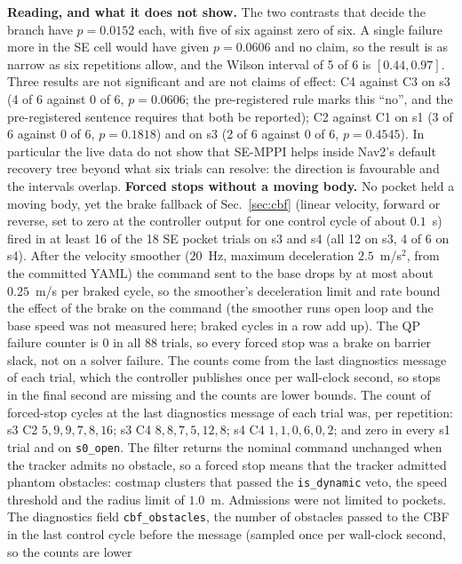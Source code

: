 \documentclass[journal]{IEEEtran}
\begin{document}
\textbf{Reading, and what it does not show.} The two contrasts that decide the branch have $p=0.0152$ each,
with five of six against zero of six. A single failure more in the SE cell would have given $p=0.0606$ and no
claim, so the result is as narrow as six repetitions allow, and the Wilson interval of 5 of 6 is
$[0.44,0.97]$. Three results are not significant and are not claims of effect: C4 against C3 on s3
(4 of 6 against 0 of 6, $p=0.0606$; the pre-registered rule marks this ``no'', and the pre-registered sentence
requires that both be reported); C2 against C1 on s1 (3 of 6 against 0 of 6, $p=0.1818$) and on s3 (2 of 6 against
0 of 6, $p=0.4545$). In particular the live data do not show that SE-MPPI helps inside Nav2's default
recovery tree beyond what six trials can resolve: the direction is favourable and the intervals overlap.
\textbf{Forced stops without a moving body.} No pocket held a moving body, yet the brake
fallback of Sec.~\ref{sec:cbf} (linear velocity, forward or reverse, set to zero at the controller
output for one control cycle of about $0.1$~s) fired in at least 16 of the 18 SE pocket trials on s3 and s4
(all 12 on s3, 4 of 6 on s4). After the velocity smoother ($20$~Hz, maximum deceleration
$2.5$~m/s$^2$, from the committed YAML) the command sent to the base drops by at most about $0.25$~m/s per braked cycle, so the
smoother's deceleration limit and rate bound the effect of the brake on the command (the smoother runs open loop and the base
speed was not measured here; braked cycles in a row add up). The QP failure counter is $0$ in all 88
trials, so every forced stop was a brake on barrier slack, not on a solver failure. The counts
come from the last diagnostics message of each trial, which the controller publishes once per
wall-clock second, so stops in the final second are missing and the counts are lower bounds.
The count of forced-stop cycles at the last
diagnostics message of each trial was, per repetition: s3 C2 $5, 9, 9, 7, 8, 16$; s3 C4
$8, 8, 7, 5, 12, 8$; s4 C4 $1, 1, 0, 6, 0, 2$; and zero in every s1 trial and on \texttt{s0\_open}.
The filter returns the nominal command unchanged when the tracker admits no obstacle, so a forced
stop means that the tracker admitted phantom obstacles: costmap clusters that passed the
\texttt{is\_dynamic} veto, the speed threshold and the radius limit of $1.0$~m. Admissions were not
limited to pockets. The diagnostics field \texttt{cbf\_obstacles}, the number of obstacles passed to
the CBF in the last control cycle before the message (sampled once per wall-clock second, so the counts are lower
\end{document}
